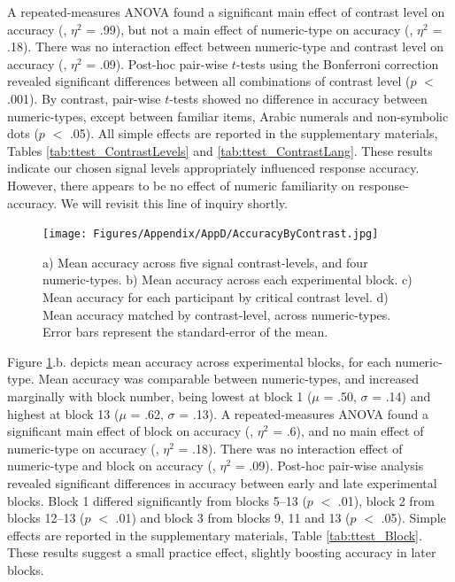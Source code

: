 A repeated-measures ANOVA found a significant main effect of contrast level on accuracy (, $\eta^2$ = .99), but not a main effect of numeric-type on accuracy (, $\eta^2$ = .18). There was no interaction effect between numeric-type and contrast level on accuracy (, $\eta^2$ = .09). Post-hoc pair-wise $t$-tests using the Bonferroni correction revealed significant differences between all combinations of contrast level ($p$ $<$ .001). By contrast, pair-wise $t$-tests showed no difference in accuracy between numeric-types, except between familiar items, Arabic numerals and non-symbolic dots ($p$ $<$ .05). All simple effects are reported in the supplementary materials, Tables \ref{tab:ttest_ContrastLevels} and \ref{tab:ttest_ContrastLang}. These results indicate our chosen signal levels appropriately influenced response accuracy. However, there appears to be no effect of numeric familiarity on response-accuracy. We will revisit this line of inquiry shortly. 

\begin{figure}[tbh]
\centering \texttt{[image: Figures/Appendix/AppD/AccuracyByContrast.jpg]}
\caption{a) Mean accuracy across five signal contrast-levels, and four numeric-types. b) Mean accuracy across each experimental block. c) Mean accuracy for each participant by critical contrast level. d) Mean accuracy matched by contrast-level, across numeric-types. Error bars represent the standard-error of the mean.}
\label{fig:AccContrast}
\end{figure}

Figure \ref{fig:AccContrast}.b. depicts mean accuracy across experimental blocks, for each numeric-type. Mean accuracy was comparable between numeric-types, and increased marginally with block number, being lowest at block 1 ($\mu$ = .50, $\sigma$ = .14) and highest at block 13 ($\mu$ = .62, $\sigma$ = .13). A repeated-measures ANOVA found a significant main effect of block on accuracy (, $\eta^2$ = .6), and no main effect of numeric-type on accuracy (, $\eta^2$ = .18). There was no interaction effect of numeric-type and block on accuracy (, $\eta^2$ = .09). Post-hoc pair-wise analysis revealed significant differences in accuracy between early and late experimental blocks. Block 1 differed significantly from blocks 5--13 ($p$ $<$ .01), block 2 from blocks 12--13 ($p$ $<$ .01) and block 3 from blocks 9, 11 and 13 ($p$ $<$ .05). Simple effects are reported in the supplementary materials, Table \ref{tab:ttest_Block}. These results suggest a small practice effect, slightly boosting accuracy in later blocks.

